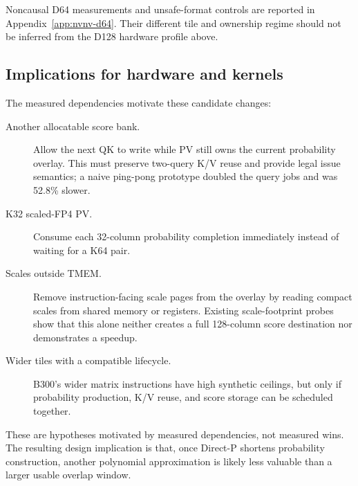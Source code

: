 Noncausal D64 measurements and unsafe-format controls are reported in
Appendix~\ref{app:nvnv-d64}.  Their different tile and ownership regime should
not be inferred from the D128 hardware profile above.

\subsection{Implications for hardware and kernels}

The measured dependencies motivate these candidate changes:
\begin{description}
  \item[Another allocatable score bank.] Allow the next QK to write while PV
  still owns the current probability overlay.  This must preserve two-query
  K/V reuse and provide legal issue semantics; a naive ping-pong prototype
  doubled the query jobs and was 52.8\% slower.
  \item[K32 scaled-FP4 PV.] Consume each 32-column probability completion
  immediately instead of waiting for a K64 pair.
  \item[Scales outside TMEM.] Remove instruction-facing scale pages from the
  overlay by reading compact scales from shared memory or registers.  Existing
  scale-footprint probes show that this alone neither creates a full
  128-column score destination nor demonstrates a speedup.
  \item[Wider tiles with a compatible lifecycle.] B300's wider matrix
  instructions have high synthetic ceilings, but only if probability
  production, K/V reuse, and score storage can be scheduled together.
\end{description}

These are hypotheses motivated by measured dependencies, not measured wins.
The resulting design implication is that, once Direct-P shortens probability
construction, another polynomial approximation is likely less valuable than
a larger usable overlap window.
